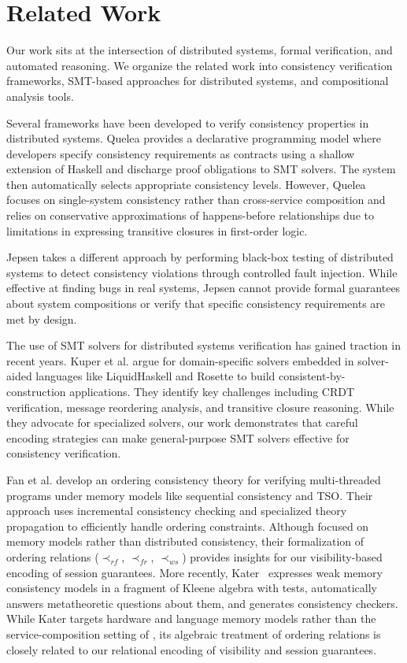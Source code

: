 \section{Related Work}

Our work sits at the intersection of distributed systems, formal
verification, and automated reasoning.
We organize the related work into consistency verification
frameworks, SMT-based approaches
for distributed systems, and compositional analysis tools.

Several frameworks have been developed to verify consistency
properties in distributed systems.
Quelea \cite{sivaramakrishnan2015declarative} provides a declarative
programming model where developers
specify consistency requirements as contracts using a shallow
extension of Haskell and discharge proof obligations to SMT solvers.
The system then automatically selects appropriate consistency levels.
However, Quelea focuses on single-system consistency rather than
cross-service composition and relies on conservative
approximations of happens-before relationships due to limitations in
expressing transitive closures in first-order logic.

Jepsen \cite{kingsbury2025jepsen} takes a different approach by
performing black-box testing of
distributed systems to detect consistency violations through
controlled fault injection. While
effective at finding bugs in real systems, Jepsen cannot provide
formal guarantees about system
compositions or verify that specific consistency requirements are met by design.

The use of SMT solvers for distributed systems verification has
gained traction in recent years.
Kuper et al. \cite{kuper2019toward} argue for domain-specific solvers
embedded in solver-aided
languages like LiquidHaskell and Rosette to build
consistent-by-construction applications.
They identify key challenges including CRDT verification, message
reordering analysis, and transitive
closure reasoning. While they advocate for specialized solvers, our
work demonstrates that careful encoding
strategies can make general-purpose SMT solvers effective for
consistency verification.

Fan et al. \cite{fan2023satisfiability} develop an ordering
consistency theory for verifying
multi-threaded programs under memory models like sequential
consistency and TSO. Their approach
uses incremental consistency checking and specialized theory
propagation to efficiently handle
ordering constraints. Although focused on memory models rather than
distributed consistency,
their formalization of ordering relations ($\prec_{rf}$,
$\prec_{fr}$, $\prec_{ws}$) provides insights
for our visibility-based encoding of session guarantees.
More recently, Kater~\cite{kater} expresses weak memory consistency models in a
fragment of Kleene algebra with tests, automatically answers metatheoretic
questions about them, and generates consistency checkers. While Kater targets hardware and language memory models rather
than the service-composition setting of \sysname{}, its algebraic treatment of
ordering relations is closely related to our relational encoding of visibility
and session guarantees.

